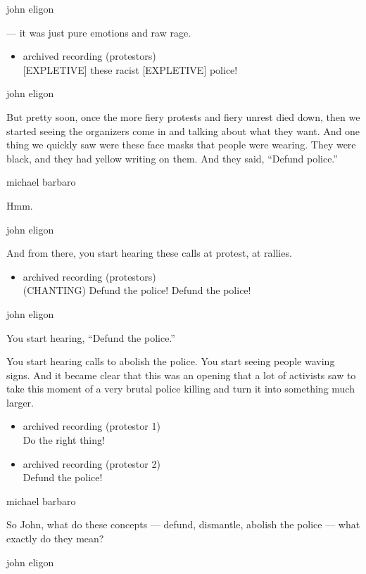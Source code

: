 john eligon

--- it was just pure emotions and raw rage.

\begin{itemize}
\tightlist
\item
  archived recording (protestors)\\
  {[}EXPLETIVE{]} these racist {[}EXPLETIVE{]} police!
\end{itemize}

john eligon

But pretty soon, once the more fiery protests and fiery unrest died
down, then we started seeing the organizers come in and talking about
what they want. And one thing we quickly saw were these face masks that
people were wearing. They were black, and they had yellow writing on
them. And they said, ``Defund police.''

michael barbaro

Hmm.

john eligon

And from there, you start hearing these calls at protest, at rallies.

\begin{itemize}
\tightlist
\item
  archived recording (protestors)\\
  (CHANTING) Defund the police! Defund the police!
\end{itemize}

john eligon

You start hearing, ``Defund the police.''

You start hearing calls to abolish the police. You start seeing people
waving signs. And it became clear that this was an opening that a lot of
activists saw to take this moment of a very brutal police killing and
turn it into something much larger.

\begin{itemize}
\item
  archived recording (protestor 1)\\
  Do the right thing!
\item
  archived recording (protestor 2)\\
  Defund the police!
\end{itemize}

michael barbaro

So John, what do these concepts --- defund, dismantle, abolish the
police --- what exactly do they mean?

john eligon

